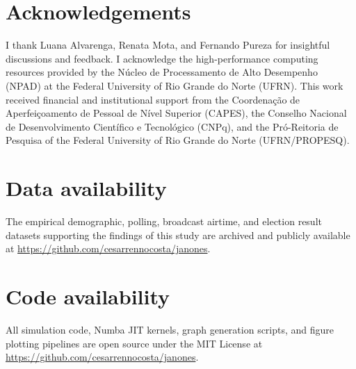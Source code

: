 \documentclass[11pt,a4paper]{article}
\begin{document}
\section*{Acknowledgements}
I thank Luana Alvarenga, Renata Mota, and Fernando Pureza for insightful discussions and feedback. I acknowledge the high-performance computing resources provided by the N{\'u}cleo de Processamento de Alto Desempenho (NPAD) at the Federal University of Rio Grande do Norte (UFRN). This work received financial and institutional support from the Coordena{\c{c}}{\~a}o de Aperfei{\c{c}}oamento de Pessoal de N{\'i}vel Superior (CAPES), the Conselho Nacional de Desenvolvimento Cient{\'i}fico e Tecnol{\'o}gico (CNPq), and the Pr{\'o}-Reitoria de Pesquisa of the Federal University of Rio Grande do Norte (UFRN/PROPESQ).

\section*{Data availability}
The empirical demographic, polling, broadcast airtime, and election result datasets supporting the findings of this study are archived and publicly available at \url{https://github.com/cesarrennocosta/janones}.

\section*{Code availability}
All simulation code, Numba JIT kernels, graph generation scripts, and figure plotting pipelines are open source under the MIT License at \url{https://github.com/cesarrennocosta/janones}.



\end{document}
